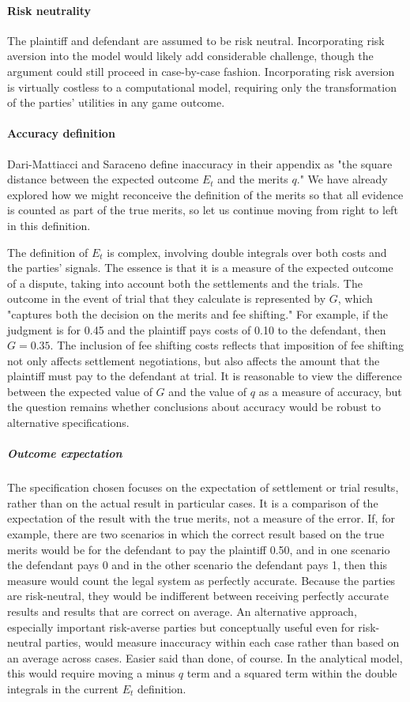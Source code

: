 \documentclass{article}
\begin{document}
\paragraph{Risk neutrality}The plaintiff and defendant are assumed to be risk neutral. Incorporating risk aversion into the model would likely add considerable challenge, though the argument could still proceed in case-by-case fashion. Incorporating risk aversion is virtually costless to a computational model, requiring only the transformation of the parties' utilities in any game outcome. 

\paragraph{Accuracy definition}Dari-Mattiacci and Saraceno define inaccuracy in their appendix as "the square distance between the expected outcome $E_t$ and the merits $q$." We have already explored how we might reconceive the definition of the merits so that all evidence is counted as part of the true merits, so let us continue moving from right to left in this definition.

The definition of $E_t$ is complex, involving double integrals over both costs and the parties' signals. The essence is that it is a measure of the expected outcome of a dispute, taking into account both the settlements and the trials. The outcome in the event of trial that they calculate is represented by $G$, which "captures both the decision on the merits and fee shifting." For example, if the judgment is for 0.45 and the plaintiff pays costs of 0.10 to the defendant, then $G=0.35$. The inclusion of fee shifting costs reflects that imposition of fee shifting not only affects settlement negotiations, but also affects the amount that the plaintiff must pay to the defendant at trial. It is reasonable to view the difference between the expected value of $G$ and the value of $q$ as a measure of accuracy, but the question remains whether conclusions about accuracy would be robust to alternative specifications.

\subparagraph{Outcome expectation}The specification chosen focuses on the expectation of settlement or trial results, rather than on the actual result in particular cases. It is a comparison of the expectation of the result with the true merits, not a measure of the error. If, for example, there are two scenarios in which the correct result based on the true merits would be for the defendant to pay the plaintiff 0.50, and in one scenario the defendant pays 0 and in the other scenario the defendant pays 1, then this measure would count the legal system as perfectly accurate. Because the parties are risk-neutral, they would be indifferent between receiving perfectly accurate results and results that are correct on average. An alternative approach, especially important risk-averse parties but conceptually useful even for risk-neutral parties, would measure inaccuracy within each case rather than based on an average across cases. Easier said than done, of course. In the analytical model, this would require moving a minus $q$ term and a squared term within the double integrals in the current $E_t$ definition. 
\end{document}
